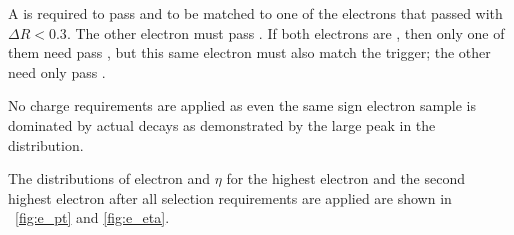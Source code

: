 A \CentralElectron is required to pass \EGTIGHT and to be matched to one of the
electrons that passed \SingleElectronTrigger with $\Delta R < 0.3$. The other
electron must pass \EGMEDIUM. If both electrons are \CentralElectrons, then
only one of them need pass \EGTIGHT, but this same electron must also match the
trigger; the other \CentralElectron need only pass \EGMEDIUM.

No charge requirements are applied as even the same sign electron sample is
dominated by actual \Z decays as demonstrated by the large peak in the \mee
distribution.

The distributions of electron \pt and $\eta$ for the highest \pt electron and
the second highest \pt electron after all selection requirements are applied
are shown in \FIGS~\ref{fig:e_pt} and \ref{fig:e_eta}.

